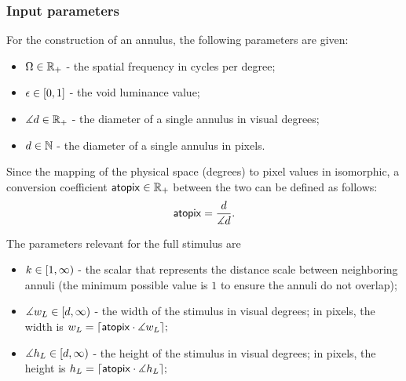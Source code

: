 \subsubsection{Input parameters}
\label{sec:stimulus-parameters}

For the construction of an annulus, the following parameters are given:
\begin{itemize}
    \item $\Omega \in \mathbb{R}_+$ - the spatial frequency in cycles per degree;
    
    \item $\epsilon \in [0, 1]$ - the void luminance value;
    
    \item $\measuredangle d \in \mathbb{R}_+$ - the diameter of a single annulus in visual degrees;
    
    \item $d \in \mathbb{N}$ - the diameter of a single annulus in pixels.
\end{itemize}
Since the mapping of the physical space (degrees) to pixel values in isomorphic, a conversion coefficient $\mathsf{atopix} \in \mathbb{R}_+$ between the two can be defined as follows:
\begin{equation}
    \mathsf{atopix} = \frac{d}{\measuredangle d}.
\end{equation}

The parameters relevant for the full stimulus are
\begin{itemize}
    \item $k \in [1, \infty)$ - the scalar that represents the distance scale between neighboring annuli (the minimum possible value is $1$ to ensure the annuli do not overlap);
    
    \item $\measuredangle w_L \in [d, \infty)$ - the width of the stimulus in visual degrees; in pixels, the width is
    $
        w_L = \lceil\mathsf{atopix} \cdot \measuredangle w_L\rceil;
    $
    
    \item $\measuredangle h_L \in [d, \infty)$ - the height of the stimulus in visual degrees; in pixels, the height is
    $
        h_L = \lceil\mathsf{atopix} \cdot \measuredangle h_L\rceil;
    $
\end{itemize}

